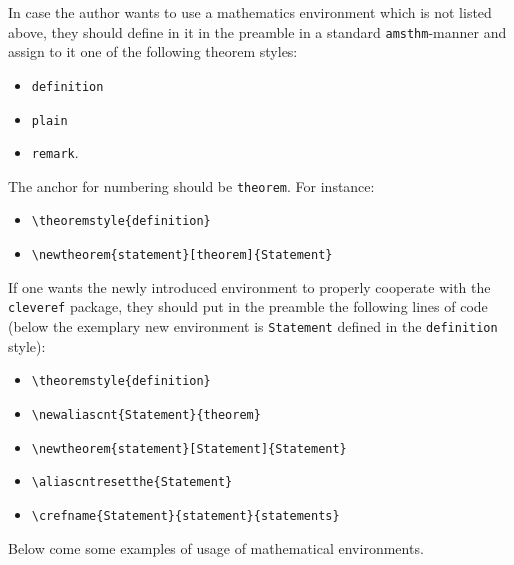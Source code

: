 \documentclass[manuscript]{BSLstyle} %
\begin{document}
In case the author wants to use a mathematics environment which is not listed above, they should define in it in the preamble in a standard \texttt{amsthm}-manner and assign to it one of the following theorem styles:
\begin{itemize}
	\item \texttt{definition}
	\item \texttt{plain}
	\item \texttt{remark}.
\end{itemize}
The anchor for numbering should be \texttt{theorem}. For instance:
\begin{itemize}
\item[]\texttt{\textbackslash theoremstyle\{definition\}}
\item[]\texttt{\textbackslash newtheorem\{statement\}[theorem]\{Statement\}}
\end{itemize}
If one wants the newly introduced environment to properly cooperate with the \texttt{cleveref} package, they should put in the preamble the following lines of code (below the exemplary new environment is \texttt{Statement} defined in the \texttt{definition} style):
\begin{itemize}
	\item[]\texttt{\textbackslash theoremstyle\{definition\}}
	\item[]\texttt{\textbackslash newaliascnt\{Statement\}\{theorem\}}
	\item[]\texttt{\textbackslash newtheorem\{statement\}[Statement]\{Statement\}}
	\item[]\texttt{\textbackslash aliascntresetthe\{Statement\}}
	\item[]\texttt{\textbackslash crefname\{Statement\}\{statement\}\{statements\}}
\end{itemize}

Below come some examples of usage of mathematical environments.
\end{document}
